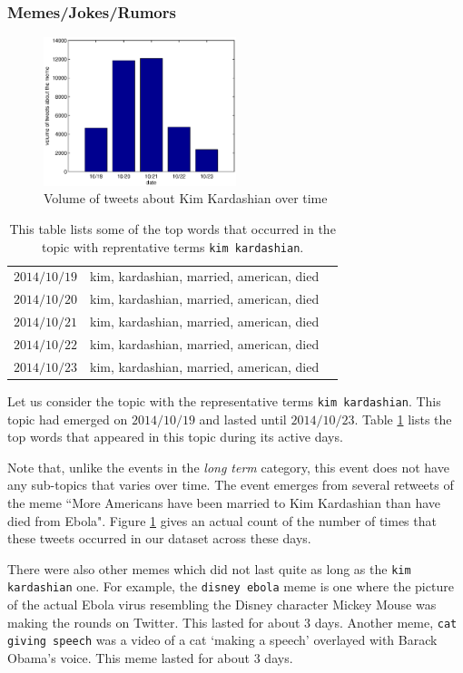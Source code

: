 \subsubsection{Memes/Jokes/Rumors}
\begin{figure}
\includegraphics[width=0.5\textwidth]{figures/kim_kardashian.eps}
\caption{Volume of tweets about Kim Kardashian over time}
\label{fig:kim_kardashian}
\end{figure}
\begin{table}
\begin{tabular}{c | c | c}
$2014/10/19$ & kim, kardashian, married, american, died\\
$2014/10/20$ & kim, kardashian, married, american, died\\
$2014/10/21$ & kim, kardashian, married, american, died\\
$2014/10/22$ & kim, kardashian, married, american, died\\
$2014/10/23$ & kim, kardashian, married, american, died\\
\end{tabular}
\caption{This table lists some of the top words that occurred in the topic with reprentative terms \texttt{kim kardashian}.}
\label{tab:kim_kardashian}
\end{table}
Let us consider the topic with the representative terms
\texttt{kim kardashian}.  This topic had emerged on $2014/10/19$ and lasted until
$2014/10/23$.  
Table \ref{tab:kim_kardashian} lists the top words that appeared in this topic during its active days.

Note that, unlike the events in the \emph{long term}
category,
this event does not have any sub-topics that varies
over time.  
The event emerges from several retweets of the meme
``More Americans have been married to Kim Kardashian
than have died from Ebola". Figure \ref{fig:kim_kardashian} gives an actual count of
the number of times that these tweets occurred in our dataset
across these days.

There were also other memes which did not last quite as long as the \texttt{kim kardashian}
one.  For example, the \texttt{disney ebola} meme is one where the picture of the actual
Ebola virus resembling the Disney character Mickey Mouse was making the rounds on
Twitter.  This lasted for about $3$ days.  Another meme, \texttt{cat giving speech} was
a video of a cat `making a speech' overlayed with Barack Obama's voice.  This meme
lasted for about $3$ days.  

